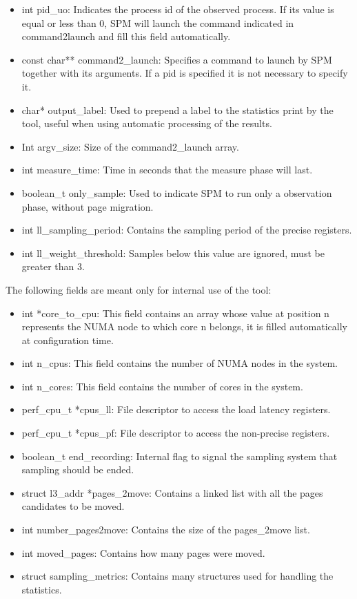 \begin{itemize}
\item int pid\_uo: Indicates the process id of the observed process. If its value is equal or less than 0, SPM will launch the command indicated in command2launch and fill this field automatically.
\item const char** command2\_launch: Specifies a command to launch by SPM together with its arguments. If a pid is specified it is not necessary to specify it.
\item char* output\_label: Used to prepend a label to the statistics print by the tool, useful when using automatic processing of the results.
\item Int argv\_size: Size of the command2\_launch array.
\item int measure\_time: Time in seconds that the measure phase will last.
\item boolean\_t only\_sample: Used to indicate SPM to run only a observation phase, without page migration.
\item int ll\_sampling\_period: Contains the sampling period of the precise registers.
\item int ll\_weight\_threshold: Samples below this value are ignored, must be greater than 3.
\end{itemize}
The following fields are meant only for internal use of the tool:
\begin{itemize}
\item int *core\_to\_cpu: This field contains an array whose value at position n represents the NUMA node to which core n belongs, it is filled automatically at configuration time.
	\item int n\_cpus: This field contains the number of NUMA nodes in the system.
\item int n\_cores: This field contains the number of cores in the system.
\item perf\_cpu\_t *cpus\_ll: File descriptor to access the load latency registers.
\item perf\_cpu\_t *cpus\_pf: File descriptor to access the non-precise registers.
\item boolean\_t end\_recording: Internal flag to signal the sampling system that sampling should be ended.
\item struct l3\_addr *pages\_2move: Contains a linked list with all the pages candidates to be moved.
\item int number\_pages2move: Contains the size of the pages\_2move list.
\item int moved\_pages: Contains how many pages were moved.
\item struct sampling\_metrics: Contains many structures used for handling the statistics.
\end{itemize}
